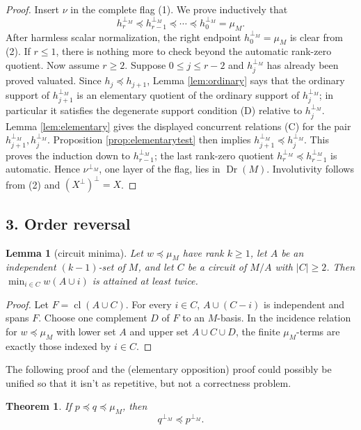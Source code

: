 \documentclass[12pt]{article}
\newcommand{\Dr}{\operatorname{Dr}}
\newcommand{\cl}{\operatorname{cl}}
\newtheorem{theorem}{Theorem}
\newtheorem{lemma}{Lemma}
\newcommand{\review}[1]{\begin{reviewbox}#1\end{reviewbox}}
\begin{document}
\begin{proof}
Insert $\nu$ in the complete flag (1).  We prove inductively that
\[
        h_r^{\perp_M}\preceq h_{r-1}^{\perp_M}\preceq\cdots
        \preceq h_0^{\perp_M}=\mu_M .
\]
After harmless scalar normalization, the right endpoint
$h_0^{\perp_M}=\mu_M$ is clear from (2).  If $r\le1$, there is
nothing more to check beyond the automatic rank-zero quotient.  Now assume $r\ge2$.
Suppose $0\le j\le r-2$ and $h_j^{\perp_M}$ has
already been proved valuated.  Since $h_j\preceq h_{j+1}$, Lemma
\ref{lem:ordinary} says that the ordinary support of
$h_{j+1}^{\perp_M}$ is an elementary quotient of the ordinary support of
$h_j^{\perp_M}$; in particular it satisfies the degenerate support
condition (D) relative to $h_j^{\perp_M}$.  Lemma
\ref{lem:elementary} gives the displayed concurrent relations (C) for
the pair $h_{j+1}^{\perp_M},h_j^{\perp_M}$.  Proposition
\ref{prop:elementarytest} then implies
$h_{j+1}^{\perp_M}\preceq h_j^{\perp_M}$.  This proves the induction
down to $h_{r-1}^{\perp_M}$; the last rank-zero quotient
$h_r^{\perp_M}\preceq h_{r-1}^{\perp_M}$ is automatic.  Hence $\nu^{\perp_M}$, one layer of the flag, lies in
$\Dr(M)$.  Involutivity follows from (2) and $(X^\perp)^\perp=X$.
\end{proof}

\subsection*{3. Order reversal}

\begin{lemma}[circuit minima]\label{lem:circuit}
Let $w\preceq\mu_M$ have rank $k\ge1$, let $A$ be an independent
$(k-1)$-set of $M$, and let $C$ be a circuit of $M/A$ with $|C|\ge2$.
Then $\min_{i\in C}w(A\cup i)$ is attained at least twice.
\end{lemma}

\begin{proof}
Let $F=\cl(A\cup C)$.  For every $i\in C$, $A\cup(C-i)$ is independent
and spans $F$.  Choose one complement $D$ of $F$ to an $M$-basis.  In
the incidence relation for $w\preceq\mu_M$ with lower set $A$ and upper
set $A\cup C\cup D$, the finite $\mu_M$-terms are exactly those indexed
by $i\in C$.
\end{proof}

\review{The following proof and the (elementary opposition) proof could possibly be unified so that it isn't as repetitive, but not a correctness problem.}

\begin{theorem}\label{thm:order}
If $p\preceq q\preceq\mu_M$, then
\[
        q^{\perp_M}\preceq p^{\perp_M}.
\]
\end{theorem}
\end{document}
